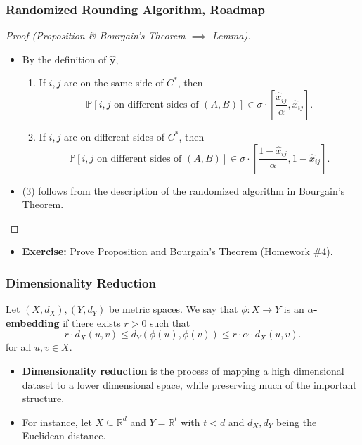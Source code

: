 \documentclass{beamer}
\newcommand{\RR}{\mathbb{R}}
\newcommand{\PP}{\mathbb{P}}
\begin{document}
    \begin{frame}
        \frametitle{Randomized Rounding Algorithm, Roadmap}
    
        \begin{proof}[Proof (Proposition \& Bourgain's Theorem $\implies$ Lemma)]
            \begin{itemize}
                \item By the definition of $\mathbf{\hat y}$,
                \begin{enumerate}
                    \item If $i, j$ are on the same side of $C^*$, then
                    $$ \PP[\text{$i, j$ on different sides of $(A, B)$}] \in \sigma \cdot \left[\frac{\hat x_{ij}}{\alpha}, \hat x_{ij}\right]. $$
                    \item If $i, j$ are on different sides of $C^*$, then
                    $$ \PP[\text{$i, j$ on different sides of $(A, B)$}] \in \sigma \cdot \left[\frac{1 - \hat x_{ij}}{\alpha}, 1 - \hat x_{ij}\right]. $$
                \end{enumerate}
                \pause
                \item (3) follows from the description of the randomized algorithm in Bourgain's Theorem.
            \end{itemize}
        \end{proof}

        \pause

        \begin{itemize}
            \item {\bf Exercise:} Prove Proposition and Bourgain's Theorem (Homework \#4).
        \end{itemize}
    \end{frame}

    \begin{frame}
        \frametitle{Dimensionality Reduction}

        \begin{definition}
            Let $(X, d_X), (Y, d_Y)$ be metric spaces. We say that $\phi : X \to Y$ is an {\bf $\alpha$-embedding} if there exists $r > 0$ such that
            $$ r \cdot d_X(u, v) \leq d_Y(\phi(u), \phi(v)) \leq r \cdot \alpha \cdot d_X(u, v). $$
            for all $u, v \in X$.
        \end{definition}

        \pause

        \begin{itemize}
            \item {\bf Dimensionality reduction} is the process of mapping a high dimensional dataset to a lower dimensional space, while preserving much of the important structure. \pause
            \item For instance, let $X \subseteq \RR^d$ and $Y = \RR^t$ with $t < d$ and $d_X, d_Y$ being the Euclidean distance.
        \end{itemize}
    \end{frame}
\end{document}
